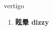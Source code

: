 
\begin{frame}
{\huge vertigo}
\begin{center}
\begin{enumerate}\Large
  \item \textbf{眩晕 dizzy}
\end{enumerate}
\end{center}
\end{frame}
